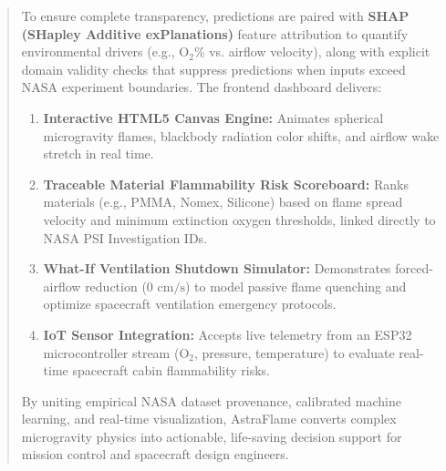 \documentclass[11pt, a4paper]{article}
\begin{document}
\begin{abstract}
To ensure complete transparency, predictions are paired with \textbf{SHAP (SHapley Additive exPlanations)} feature attribution to quantify environmental drivers (e.g., $\mathrm{O_2\%}$ vs. airflow velocity), along with explicit domain validity checks that suppress predictions when inputs exceed NASA experiment boundaries. The frontend dashboard delivers:
\begin{enumerate}[leftmargin=*]
    \item \textbf{Interactive HTML5 Canvas Engine:} Animates spherical microgravity flames, blackbody radiation color shifts, and airflow wake stretch in real time.
    \item \textbf{Traceable Material Flammability Risk Scoreboard:} Ranks materials (e.g., PMMA, Nomex, Silicone) based on flame spread velocity and minimum extinction oxygen thresholds, linked directly to NASA PSI Investigation IDs.
    \item \textbf{What-If Ventilation Shutdown Simulator:} Demonstrates forced-airflow reduction ($0\text{ cm/s}$) to model passive flame quenching and optimize spacecraft ventilation emergency protocols.
    \item \textbf{IoT Sensor Integration:} Accepts live telemetry from an ESP32 microcontroller stream ($\mathrm{O_2}$, pressure, temperature) to evaluate real-time spacecraft cabin flammability risks.
\end{enumerate}

By uniting empirical NASA dataset provenance, calibrated machine learning, and real-time visualization, AstraFlame converts complex microgravity physics into actionable, life-saving decision support for mission control and spacecraft design engineers.
\end{abstract}
\end{document}
